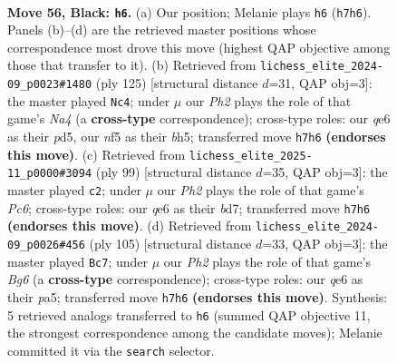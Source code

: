 \documentclass[11pt]{article}
\begin{document}
\clearpage

\begin{figure}[p]\centering
\begin{subfigure}{0.46\textwidth}\centering
\resizebox{\linewidth}{!}{%
\newchessgame
\chessboard[
  setfen={5k2/1p5p/4Q3/5N1p/8/8/6R1/6K1 b - - 2 56},
  showmover=false,
  pgfstyle=straightmove, color=movearrow, markmove={h7-h6}
]}
\caption{}
\end{subfigure}\hfill
\begin{subfigure}{0.46\textwidth}\centering
\resizebox{\linewidth}{!}{%
\newchessgame
\chessboard[
  setfen={8/8/3p4/n2P3B/8/p7/3k4/KR6 b - - 0 63},
  showmover=false,
  pgfstyle=straightmove, color=movearrow, markmove={a5-c4}
]}
\caption{}
\end{subfigure}
\\[4pt]
\begin{subfigure}{0.46\textwidth}\centering
\resizebox{\linewidth}{!}{%
\newchessgame
\chessboard[
  setfen={8/3B2k1/8/p5N1/5P1N/1pp5/5RK1/8 b - - 0 50},
  showmover=false,
  pgfstyle=straightmove, color=movearrow, markmove={c3-c2}
]}
\caption{}
\end{subfigure}\hfill
\begin{subfigure}{0.46\textwidth}\centering
\resizebox{\linewidth}{!}{%
\newchessgame
\chessboard[
  setfen={8/8/2p5/P5kp/3R4/3K2b1/8/8 b - - 0 53},
  showmover=false,
  pgfstyle=straightmove, color=movearrow, markmove={g3-c7}
]}
\caption{}
\end{subfigure}
\caption{\textbf{Move 56, Black: \texttt{h6}.} (a) Our position; Melanie plays \texttt{h6} (\texttt{h7h6}). Panels (b)--(d) are the retrieved master positions whose correspondence most drove this move (highest QAP objective among those that transfer to it). (b) Retrieved from \texttt{lichess\_elite\_2024-09\_p0023\#1480} (ply 125) [structural distance $d$=31, QAP obj=3]: the master played \texttt{Nc4}; under $\mu$ our \emph{Ph2} plays the role of that game's \emph{Na4} (a \textbf{cross-type} correspondence); cross-type roles: our \emph{q}e6 as their \emph{p}d5, our \emph{n}f5 as their \emph{b}h5; transferred move \texttt{h7h6} \textbf{(endorses this move)}. (c) Retrieved from \texttt{lichess\_elite\_2025-11\_p0000\#3094} (ply 99) [structural distance $d$=35, QAP obj=3]: the master played \texttt{c2}; under $\mu$ our \emph{Ph2} plays the role of that game's \emph{Pc6}; cross-type roles: our \emph{q}e6 as their \emph{b}d7; transferred move \texttt{h7h6} \textbf{(endorses this move)}. (d) Retrieved from \texttt{lichess\_elite\_2024-09\_p0026\#456} (ply 105) [structural distance $d$=33, QAP obj=3]: the master played \texttt{Bc7}; under $\mu$ our \emph{Ph2} plays the role of that game's \emph{Bg6} (a \textbf{cross-type} correspondence); cross-type roles: our \emph{q}e6 as their \emph{p}a5; transferred move \texttt{h7h6} \textbf{(endorses this move)}. Synthesis: 5 retrieved analogs transferred to \texttt{h6} (summed QAP objective 11, the strongest correspondence among the candidate moves); Melanie committed it via the \texttt{search} selector.}
\label{fig:thought-m111}
\end{figure}
\end{document}

